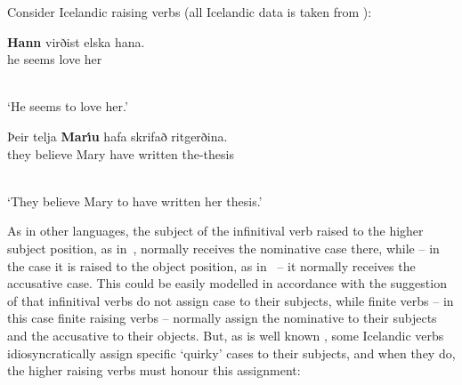 \documentclass[output=paper]{langsci/langscibook}
\begin{document}
Consider Icelandic raising verbs (all Icelandic data is taken from \citealt[304–305]{SKG92}):
\begin{examples}
\item \label{isl:nom}
  \begin{examples}
  \item 
    \begin{gloss}
      \textbf{Hann} virðist elska hana. \\
      he\Nom{} seems love\Inf{} her\Acc{}
    \end{gloss}\\[\glosslen]
    `He seems to love her.'
  \item 
    \begin{gloss}
      {Þ}eir telja \textbf{Mar{\'\i}u} hafa skrifað ritgerðina. \\
      they believe Mary\Acc{} have\Inf{} written the-thesis
    \end{gloss}\\[\glosslen]
    `They believe Mary to have written her thesis.'
  \end{examples}
\end{examples}
As in other languages, the subject of the infinitival verb raised to the higher subject position, as in~, normally receives the nominative case there, while – in the case it is raised to the object position, as in~ – it normally receives the accusative case.  This could be easily modelled in accordance with the suggestion of \citet[30]{ps2} that infinitival verbs do not assign case to their subjects, while finite verbs – in this case finite raising verbs – normally assign the nominative to their subjects and the accusative to their objects.  But, as is well known \citep{Andrews82a-u-kopiert,zae:mal:83,ZMT85a}, some Icelandic verbs idiosyncratically assign specific ‘quirky’ cases to their subjects, and when they do, the higher raising verbs must honour this assignment:
\end{document}
